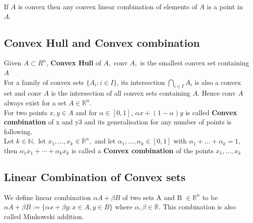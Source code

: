 \documentclass[oneside]{book}
\begin{document}
	
	If $A$ is convex then any convex linear combination of elements
	of $A$ is a point in $A .$\\
	
	
	\subsection{Convex Hull and Convex combination} \label{ss:4}
	Given $A \subset R^{n}$, \textbf{Convex Hull} of $A,$ conv $A,$ is the smallest
	convex set containing $A $ \\
	For a family of convex sets $\{ A_{i} :i \in I\}$, its intersection  $ \bigcap_{i \in I} A_{i}$ is  also a  convex set and conv $A$ is the intersection of all convex sets containing $A$. Hence conv $A$ always exist for a set $A \in \mathbb{R}^n $. \\
	For two points $x,y \in A$ and for $\alpha \in [0,1]$, $\alpha x +(1- \alpha)y  $ is called \textbf{Convex combination} of x and y3 and its 
	generalisation for any number of  points is following. \\
	
	Let $k \in \mathbb{N},$ let $x_{1}, \ldots, x_{k} \in \mathbb{R}^{n},$ and let $\alpha_{1}, \ldots, \alpha_{k} \in[0,1]$ with $\alpha_{1}+\ldots+\alpha_{k}=1,$ then
	$\alpha_{1} x_{1}+\cdots+\alpha_{k} x_{k}$ is called a \textbf{Convex combination} of the points $x_{1}, \ldots, x_{k}$
	
	
	
	
	
	
	
	
	
	\subsection{Linear Combination of Convex sets}
	\label{ss:5}
	We define linear combination $\alpha A+\beta B$ of two sets A and B $\in \mathbb{R}^n$ to be 
	$\alpha A+\beta B:=\{\alpha x+\beta y: x \in A, y \in B\}$ where $\alpha,\beta \in \mathbb{R}$.
	This combination is also called Minkowski addition.
	
\end{document}
